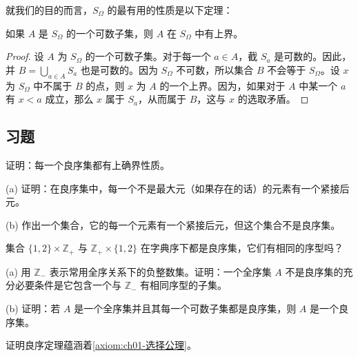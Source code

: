 \documentclass[../../main.tex]{subfiles}
\begin{document}
就我们的目的而言，$S_{\Omega}$ 的最有用的性质是以下定理：

\begin{theorem}[可数子集有上界]\label{theorem:ch01-可数上界}
如果 $A$ 是 $S_{\Omega}$ 的一个可数子集，则 $A$ 在 $S_{\Omega}$ 中有上界。
\end{theorem}

\begin{proof}
设 $A$ 为 $S_{\Omega}$ 的一个可数子集。对于每一个 $a \in A$，截 $S_{a}$ 是可数的。因此，并 $B = \bigcup_{a \in A} S_{a}$ 也是可数的。因为 $S_{\Omega}$ 不可数，所以集合 $B$ 不会等于 $S_{\Omega}$。设 $x$ 为 $S_{\Omega}$ 中不属于 $B$ 的点，则 $x$ 为 $A$ 的一个上界。因为，如果对于 $A$ 中某一个 $a$ 有 $x < a$ 成立，那么 $x$ 属于 $S_{a}$，从而属于 $B$，这与 $x$ 的选取矛盾。
\end{proof}

\subsection*{习题}

\begin{exercise}\label{exercise:ch01-良序集-1}
证明：每一个良序集都有上确界性质。
\end{exercise}

\begin{exercise}\label{exercise:ch01-良序集-2}
(a) 证明：在良序集中，每一个不是最大元（如果存在的话）的元素有一个紧接后元。

(b) 作出一个集合，它的每一个元素有一个紧接后元，但这个集合不是良序集。
\end{exercise}

\begin{exercise}\label{exercise:ch01-良序集-3}
集合 $\{1, 2\} \times \mathbb{Z}_{+}$ 与 $\mathbb{Z}_{+} \times \{1, 2\}$ 在字典序下都是良序集，它们有相同的序型吗？
\end{exercise}

\begin{exercise}\label{exercise:ch01-良序集-4}
(a) 用 $\mathbb{Z}_{-}$ 表示常用全序关系下的负整数集。证明：一个全序集 $A$ 不是良序集的充分必要条件是它包含一个与 $\mathbb{Z}_{-}$ 有相同序型的子集。

(b) 证明：若 $A$ 是一个全序集并且其每一个可数子集都是良序集，则 $A$ 是一个良序集。
\end{exercise}

\begin{exercise}\label{exercise:ch01-良序集-5}
证明良序定理蕴涵着\cref{axiom:ch01-选择公理}。
\end{exercise}
\end{document}
